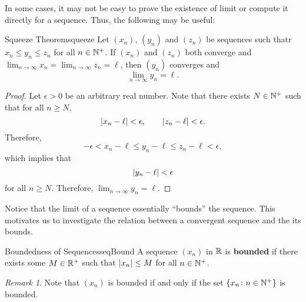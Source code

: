 \documentclass[math]{amznotes}
\theoremstyle{remark}
\newtheorem*{remark}{Remark}
\begin{document}
In some cases, it may not be easy to prove the existence of limit or compute it directly for a sequence. Thus, the following may be useful:
\begin{thmbox}{Squeeze Theorem}{squeeze}
    Let $(x_n)$, $(y_n)$ and $(z_n)$ be sequences such thatr $x_n \leq y_n \leq z_n$ for all $n \in \mathbb{N}^+$. If $(x_n)$ and $(z_n)$ both converge and $\lim_{n \to \infty}x_n = \lim_{n \to \infty}z_n = \ell$, then $(y_n)$ converges and
    \begin{equation*}
        \lim_{n \to \infty}y_n = \ell.
    \end{equation*}
    \tcblower  
    \begin{proof}
        Let $\epsilon > 0$ be an arbitrary real number. Note that there exists $N \in \mathbb{N}^+$ such that for all $n \geq N$,
        \begin{equation*}
            {\left\lvert {x_n - \ell} \right\rvert} < \epsilon, \qquad {\left\lvert {z_n - \ell} \right\rvert} < \epsilon.
        \end{equation*}
        Therefore,
        \begin{equation*}
            -\epsilon < x_n - \ell \leq y_n - \ell \leq z_n - \ell < \epsilon,
        \end{equation*}
        which implies that
        \begin{equation*}
            {\left\lvert {y_n - \ell} \right\rvert} < \epsilon
        \end{equation*}
        for all $n \geq N$. Therefore, $\lim_{n \to \infty}y_n = \ell$.
    \end{proof}
\end{thmbox}
Notice that the limit of a sequence essentially ``bounds'' the sequence. This motivates us to investigate the relation between a convergent sequence and the its bounds.
\begin{dfnbox}{Boundedness of Sequences}{seqBound}
    A sequence $(x_n)$ in $\mathbb{R}$ is {\color{red} \textbf{bounded}} if there exists some $M \in \mathbb{R}^+$ such that ${\left\lvert {x_n} \right\rvert} \leq M$ for all $n \in \mathbb{N}^+$.
\end{dfnbox}
\begin{notebox}
    \begin{remark}
        Note that $(x_n)$ is bounded if and only if the set $\left\{x_n \colon n \in \mathbb{N}^+\right\}$ is bounded.
    \end{remark}
\end{notebox}
\end{document}
